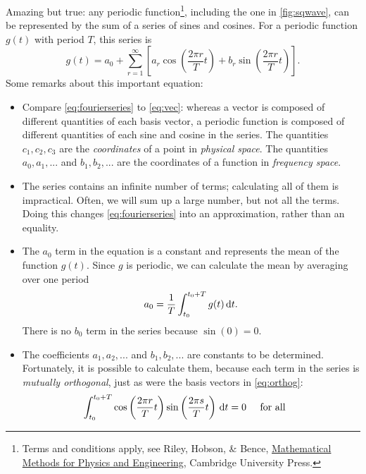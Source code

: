 \documentclass[11pt,twoside,a4paper]{article}
\begin{document}
Amazing but true: any periodic function\footnote{\raggedright Terms
  and conditions apply, see Riley, Hobson, \& Bence,
  \underline{Mathematical Methods for Physics and Engineering},
  Cambridge University Press.}, including the one in
\autoref{fig:sqwave}, can be represented by the sum of a series of
sines and cosines.  For a periodic function $g(t)$ with period $T$,
this series is
\begin{equation}
  \label{eq:fourierseries}
  g(t) = a_0 + \sum_{r=1}^\infty
  \left[a_r\cos\left(\frac{2\pi r}{T}t\right) +
    b_r\sin\left(\frac{2\pi r}{T}t\right)\right].
\end{equation}
Some remarks about this important equation:
\begin{itemize}
\item Compare \autoref{eq:fourierseries} to \autoref{eq:vec}: whereas
  a vector is composed of different quantities of each basis vector, a
  periodic function is composed of different quantities of each sine
  and cosine in the series.  The quantities $c_1,c_2,c_3$ are the
  \textit{coordinates} of a point in \textit{physical space}. The
  quantities $a_0,a_1,...$ and $b_1,b_2,...$ are the coordinates of a
  function in \textit{frequency space}.
\item The series contains an infinite number of terms; calculating all
  of them is impractical.  Often, we will sum up a large number, but
  not all the terms.  Doing this changes \autoref{eq:fourierseries}
  into an approximation, rather than an equality.
\item The $a_0$ term in the equation is a constant and represents the
  mean of the function $g(t)$.  Since $g$ is periodic, we can
  calculate the mean by averaging over one period
  \begin{equation}
    \label{eq:a0term}
    a_0 = \frac{1}{T}\int_{t_0}^{t_0+T}g(t)\,\textrm{d} t.
  \end{equation}
  There is no $b_0$ term in the series because $\sin(0)=0$.
\item The coefficients $a_1,a_2,...$ and $b_1,b_2,...$ are constants
  to be determined.  Fortunately, it is possible to calculate them,
  because each term in the series is \textit{mutually orthogonal},
  just as were the basis vectors in \autoref{eq:orthog}:
  \begin{subequations}
    \label{eq:orthogcond}
    \begin{align}
      \int_{t_0}^{t_0+T}\cos\left(\frac{2\pi r}{T}t\right)
      \sin\left(\frac{2\pi s}{T}t\right)\,\textrm{d} t&=0 \;\;\;\;\;
      \text{for all
}
\end{align}
\end{subequations}
\end{itemize}
\end{document}
